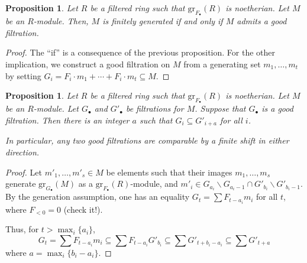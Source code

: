 \documentclass[11pt]{book}
\newtheorem{proposition}[theorem]{Proposition}
\numberwithin{equation}{section}
\numberwithin{theorem}{chapter}
\theoremstyle{definition}
\newtheorem*{basic properties}{Basic Properties}
\newtheorem*{Important Remark}{Important Remark}
\theoremstyle{remark}
\begin{document}
\begin{proposition}
	Let $R$ be a filtered ring such that $\mathrm{gr}_{F_\bullet}(R)$ is noetherian. Let $M$ be an $R$-module. Then, $M$ is finitely generated if and only if $M$ admits a good filtration.
\end{proposition}
\begin{proof}
	The ``if'' is a consequence of the previous proposition. For the other implication, we construct a good filtration on $M$ from a generating set $m_1,\dots, m_t$ by setting $G_i =  F_i \cdot m_1 + \cdots + F_i \cdot m_t \subseteq M$.
\end{proof}

\begin{proposition}
	Let $R$ be a filtered ring such that $\mathrm{gr}_{F_\bullet}(R)$ is noetherian. Let $M$ be an $R$-module. Let $G_\bullet$ and $G'_\bullet$ be filtrations for $M$. Suppose that $G_\bullet$ is a good filtration. Then there is an integer $a$ such that $G_i \subseteq G'_{i+a}$ for all $i$.
	
	In particular, any two good filtrations are comparable by a finite shift in either direction.
\end{proposition}
\begin{proof} Let $m'_1,\dots,m'_s\in M$ be elements such that their images $m_1,\dots, m_s$ generate $\mathrm{gr}_{G_\bullet}(M)$ as a $\mathrm{gr}_{F_\bullet}(R)$-module, and $m'_i\in G_{a_i}\smallsetminus G_{a_i-1} \cap G'_{b_i}\smallsetminus G'_{b_i-1}$. By the generation assumption, one has an equality $G_t= \sum F_{t-a_i} m_i$ for all $t$, where $F_{<0}=0$ (check it!).
	
	 Thus, for $t>\max_i \{a_i\}$, 
	\[G_t =\sum F_{t-a_i} m_i \subseteq \sum F_{t-a_i} G'_{b_i} \subseteq \sum G'_{t+b_i-a_i} \subseteq \sum G'_{t+a} \]
	where $a=\max_i \{b_i-a_i\}$.
\end{proof}
\end{document}
